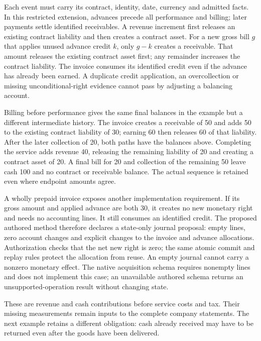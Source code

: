 Each event must carry its contract, identity, date, currency and admitted
facts. In this restricted extension, advances precede all performance and
billing; later payments settle identified receivables. A revenue increment
first releases an existing contract liability and then creates a contract asset.
For a new gross bill $g$ that applies unused advance credit $k$, only $g-k$
creates a receivable. That amount releases the existing contract asset first;
any remainder increases the contract liability. The invoice consumes its
identified credit even if the advance has already been earned. A duplicate
credit application, an overcollection or missing unconditional-right evidence
cannot pass by adjusting a balancing account.

Billing before performance gives the same final balances in the example but
a different intermediate history. The invoice creates a receivable of 50 and
adds 50 to the existing contract liability of 30; earning 60 then releases 60
of that liability. After the later collection of 20, both paths have the
balances above. Completing the service adds revenue 40, releasing the remaining
liability of 20 and creating a contract asset of 20. A final bill for 20 and
collection of the remaining 50 leave cash 100 and no contract or receivable
balance. The actual sequence is retained even where endpoint amounts agree.

A wholly prepaid invoice exposes another implementation requirement. If its
gross amount and applied advance are both 30, it creates no new monetary right
and needs no accounting lines. It still consumes an identified credit. The
proposed authored method therefore declares a state-only journal proposal:
empty lines, zero account changes and explicit changes to the invoice and
advance allocations. Authorization checks that the net new right is zero;
the same atomic commit and replay rules protect the allocation from reuse.
An empty journal cannot carry a nonzero monetary effect. The native acquisition
schema requires nonempty lines and does not implement this case; an unavailable
authored schema returns an unsupported-operation result without changing state.



These are revenue and cash contributions before service costs and tax. Their
missing measurements remain inputs to the complete company statements. The
next example retains a different obligation: cash already received may have
to be returned even after the goods have been delivered.

